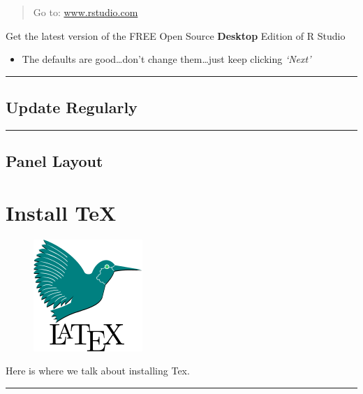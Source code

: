 \documentclass[]{book}
\providecommand{\tightlist}{%
  \setlength{\itemsep}{0pt}\setlength{\parskip}{0pt}}
\theoremstyle{definition}
\theoremstyle{definition}
\theoremstyle{definition}
\theoremstyle{remark}
\begin{document}
\begin{quote}
Go to: \href{http://www.rstudio.com}{www.rstudio.com}
\end{quote}

Get the latest version of the FREE Open Source \textbf{Desktop} Edition
of R Studio

\begin{itemize}
\tightlist
\item
  The defaults are good\ldots{}don't change them\ldots{}just keep
  clicking \emph{`Next'}
\end{itemize}

\begin{center}\rule{0.5\linewidth}{\linethickness}\end{center}

\section{Update Regularly}\label{update-regularly-1}

\begin{center}\rule{0.5\linewidth}{\linethickness}\end{center}

\section{Panel Layout}\label{panel-layout}

\chapter{Install TeX}\label{install-tex}

\begin{figure}
\centering
\includegraphics{img/latex.png}
\caption{}
\end{figure}

Here is where we talk about installing Tex.

\begin{center}\rule{0.5\linewidth}{\linethickness}\end{center}
\end{document}
